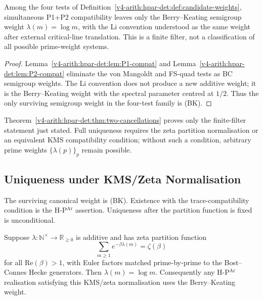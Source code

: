 \begin{theorem}
\label{v4-arith:hpar-det:thm:two-cancellations}
Among the four tests of
Definition~\ref{v4-arith:hpar-det:def:candidate-weights}, simultaneous P1+P2
compatibility leaves only the Berry--Keating semigroup weight
\(\lambda(m)=\log m\), with the Li convention understood as the same
weight after external critical-line translation. This is a finite
filter, not a classification of all possible prime-weight systems.
\end{theorem}

\begin{proof}
Lemma~\ref{v4-arith:hpar-det:lem:P1-compat} and
Lemma~\ref{v4-arith:hpar-det:lem:P2-compat} eliminate the von Mangoldt and
FS-quad tests as BC semigroup weights. The Li convention does not
produce a new additive weight; it is the Berry--Keating weight with the
spectral parameter centred at \(1/2\). Thus the only surviving
semigroup weight in the four-test family is (BK).
\end{proof}

\begin{remark}
\label{v4-arith:hpar-det:rem:BK-survivor}
Theorem~\ref{v4-arith:hpar-det:thm:two-cancellations} proves only the
finite-filter statement just stated. Full uniqueness requires the
zeta partition normalisation or an equivalent KMS compatibility
condition; without such a condition, arbitrary prime weights
\(\{\lambda(p)\}_{p}\) remain possible.
\end{remark}

\subsection{Uniqueness under KMS/Zeta Normalisation}
\label{v4-arith:hpar-det:uniqueness-given-existence}

The surviving canonical weight is (BK). Existence with the
trace-compatibility condition is the H-P\(^{\mathrm{Ar}}\) assertion.
Uniqueness after the partition function is fixed is unconditional.

\begin{theorem}
\label{v4-arith:hpar-det:thm:uniqueness-given-existence}
Suppose
\(\lambda:\mathbb{N}^{\times}\to\mathbb{R}_{\geq0}\) is additive and
has zeta partition function
\[
 \sum_{m\geq1}e^{-\beta\lambda(m)}=\zeta(\beta)
\]
for all \(\mathrm{Re}(\beta)>1\), with Euler factors matched
prime-by-prime to the Bost--Connes Hecke generators. Then
\(\lambda(m)=\log m\). Consequently any H-P\(^{\mathrm{Ar}}\)
realisation satisfying this KMS/zeta normalisation uses the
Berry--Keating weight.
\end{theorem}

